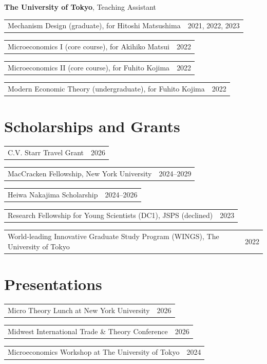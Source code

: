 \documentclass[11pt,letterpaper]{article}
\makeatletter
\newcommand{\cventry}[2]{%
  \begin{tabularx}{\textwidth}{@{}X r@{}}
    \begin{minipage}[t]{\linewidth}#1\end{minipage} & #2
  \end{tabularx}%
}
\makeatother
\begin{document}
\begin{minipage}[t]{\textwidth}
\setlength{\parskip}{3pt}
\textbf{The University of Tokyo}, Teaching Assistant\par\nopagebreak

\cventry{
  Mechanism Design (graduate), for Hitoshi Matsushima
}{2021, 2022, 2023}

\vspace{5pt}

\cventry{
  Microeconomics I (core course), for Akihiko Matsui
}{2022}

\vspace{5pt}

\cventry{
  Microeconomics II (core course), for Fuhito Kojima
}{2022}

\vspace{5pt}

\cventry{
  Modern Economic Theory (undergraduate), for Fuhito Kojima
}{2022}
\end{minipage}

\section*{Scholarships and Grants}

\cventry{
  C.V. Starr Travel Grant
}{2026}

\cventry{
  MacCracken Fellowship, New York University
}{2024--2029}

\cventry{
  Heiwa Nakajima Scholarship
}{2024--2026}

\cventry{
  Research Fellowship for Young Scientists (DC1), JSPS (declined)
}{2023}

\cventry{
  World-leading Innovative Graduate Study Program (WINGS),
  The University of Tokyo
}{2022}

\section*{Presentations}

\cventry{
  Micro Theory Lunch at New York University
}{2026}

\cventry{
  Midwest International Trade \& Theory Conference
}{2026}

\cventry{
  Microeconomics Workshop at The University of Tokyo
}{2024}
\end{document}
